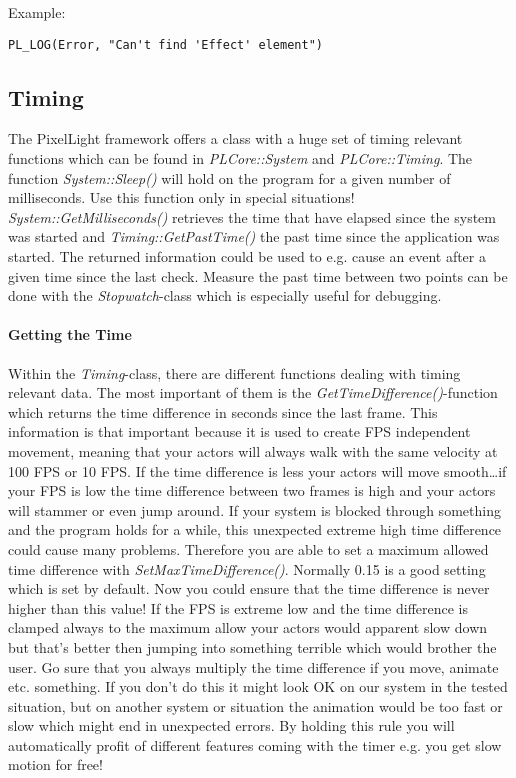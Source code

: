 Example:
\begin{lstlisting}[caption=Using the log singleton though the log macros]
PL_LOG(Error, "Can't find 'Effect' element")
\end{lstlisting}





\subsection{Timing}
The PixelLight framework offers a class with a huge set of timing relevant functions which can be found in \emph{PLCore::System} and \emph{PLCore::Timing}. The function \emph{System::Sleep()} will hold on the program for a given number of milliseconds. Use this function only in special situations! \emph{System::GetMilliseconds()} retrieves the time that have elapsed since the system was started and \emph{Timing::GetPastTime()} the past time since the application was started. The returned information could be used to e.g. cause an event after a given time since the last check. Measure the past time between two points can be done with the \emph{Stopwatch}-class which is especially useful for debugging.


\paragraph{Getting the Time}
Within the \emph{Timing}-class, there are different functions dealing with timing relevant data. The most important of them is the \emph{GetTimeDifference()}-function which returns the time difference in seconds since the last frame. This information is that important because it is used to create \ac{FPS} independent movement, meaning that your actors will always walk with the same velocity at 100 \ac{FPS} or 10 \ac{FPS}. If the time difference is less your actors will move smooth\ldots if your \ac{FPS} is low the time difference between two frames is high and your actors will stammer or even jump around. If your system is blocked through something and the program holds for a while, this unexpected extreme high time difference could cause many problems. Therefore you are able to set a maximum allowed time difference with \emph{SetMaxTimeDifference()}. Normally 0.15 is a good setting which is set by default. Now you could ensure that the time difference is never higher than this value! If the \ac{FPS} is extreme low and the time difference is clamped always to the maximum allow your actors would apparent slow down but that's better then jumping into something terrible which would brother the user. Go sure that you always multiply the time difference if you move, animate etc. something. If you don't do this it might look OK on our system in the tested situation, but on another system or situation the animation would be too fast or slow which might end in unexpected errors. By holding this rule you will automatically profit of different features coming with the timer e.g. you get slow motion for free!


